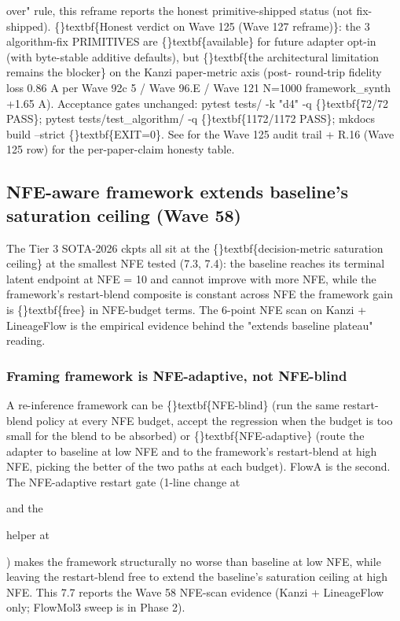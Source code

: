 \documentclass{article}
\begin{document}
over" rule, this reframe reports the honest primitive-shipped status (not fix-shipped). \{\}textbf\{Honest verdict on Wave 125 (Wave 127 reframe)\}: the 3 algorithm-fix PRIMITIVES are \{\}textbf\{available\} for future adapter opt-in (with byte-stable additive defaults), but \{\}textbf\{the architectural limitation remains the blocker\} on the Kanzi paper-metric axis (post- round-trip fidelity loss  0.86 A per Wave 92c 5 / Wave 96.E / Wave 121 N=1000 framework\_synth +1.65 A). Acceptance gates unchanged: pytest tests/ -k "d4" -q  \{\}textbf\{72/72 PASS\}; pytest tests/test\_algorithm/ -q  \{\}textbf\{1172/1172 PASS\}; mkdocs build --strict  \{\}textbf\{EXIT=0\}. See  for the Wave 125 audit trail +  R.16 (Wave 125 row) for the per-paper-claim honesty table.

\subsection{NFE-aware framework  extends baseline's saturation ceiling (Wave 58)}
The Tier 3 SOTA-2026 ckpts all sit at the \{\}textbf\{decision-metric saturation ceiling\} at the smallest NFE tested (7.3, 7.4): the baseline reaches its terminal latent endpoint at NFE = 10 and cannot improve with more NFE, while the framework's restart-blend composite is constant across NFE  the framework gain is \{\}textbf\{free\} in NFE-budget terms. The 6-point NFE scan on Kanzi + LineageFlow is the empirical evidence behind the "extends baseline plateau" reading.

\subsubsection{Framing  framework is NFE-adaptive, not NFE-blind}
A re-inference framework can be \{\}textbf\{NFE-blind\} (run the same restart-blend policy at every NFE budget, accept the regression when the budget is too small for the blend to be absorbed) or \{\}textbf\{NFE-adaptive\} (route the adapter to baseline at low NFE and to the framework's restart-blend at high NFE, picking the better of the two paths at each budget). FlowA is the second. The NFE-adaptive restart gate (1-line change at

 and the

 helper at

) makes the framework structurally no worse than baseline at low NFE, while leaving the restart-blend free to extend the baseline's saturation ceiling at high NFE. This 7.7 reports the Wave 58 NFE-scan evidence (Kanzi + LineageFlow only; FlowMol3 sweep is in Phase 2).
\end{document}
